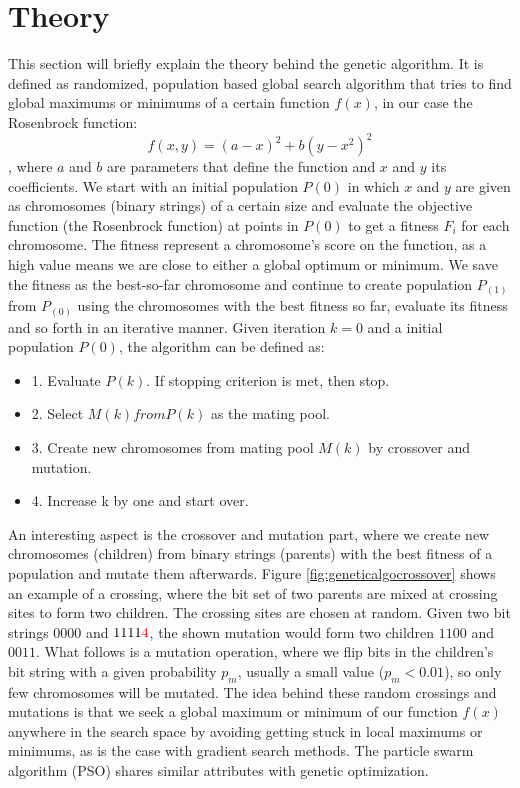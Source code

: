 \section{Theory}\label{sec:theory}

This section will briefly explain the theory behind the genetic algorithm. It is defined as randomized, population based global search algorithm that tries to find global maximums or minimums of a certain function $f(x)$, in our case the Rosenbrock function: $$f(x,y) = (a-x)^2+b(y-x^2)^2$$, where $a$ and $b$ are parameters that define the function and $x$ and $y$ its coefficients. We start with an initial population $P(0)$ in which $x$ and $y$ are given as chromosomes (binary strings) of a certain size and evaluate the objective function (the Rosenbrock function\cite{Shang2006}) at points in $P(0)$ to get a fitness $F_{i}$ for each chromosome. The fitness represent a chromosome's score on the function, as a high value means we are close to either a global optimum or minimum. We save the fitness as the best-so-far chromosome and continue to create population $P_(1)$ from $P_(0)$ using the chromosomes with the best fitness so far, evaluate its fitness and so forth in an iterative manner. Given iteration $k=0$ and a initial population $P(0)$, the algorithm can be defined as\cite{Chong2013}:

\begin{itemize}
	\item 1. Evaluate $P(k)$. If stopping criterion is met, then stop.
	\item 2. Select $M(k) from P(k)$ as the mating pool.
	\item 3. Create new chromosomes from mating pool $M(k)$ by crossover and mutation.
	\item 4. Increase k by one and start over.
\end{itemize}

An interesting aspect is the crossover and mutation part, where we create new chromosomes (children) from binary strings (parents) with the best fitness of a population and mutate them afterwards. Figure \ref{fig:geneticalgocrossover} shows an example of a crossing, where the bit set of two parents are mixed at crossing sites to form two children. The crossing sites are chosen at random. Given two bit strings $0000$ and $1111{\color{red}4}$, the shown mutation would form two children $1100$ and $0011$. What follows is a mutation operation, where we flip bits in the children's bit string with a given probability $p_{m}$, usually a small value ($p_{m} < 0.01$), so only few chromosomes will be mutated. The idea behind these random crossings and mutations is that we seek a global maximum or minimum of our function $f(x)$ anywhere in the search space by avoiding getting stuck in local maximums or minimums, as is the case with gradient search methods. The particle swarm algorithm (PSO) shares similar attributes with genetic optimization.

